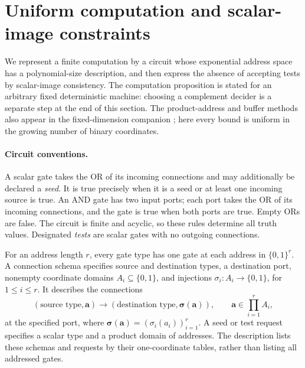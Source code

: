 \section{Uniform computation and scalar-image constraints}\label{sec:computation}

We represent a finite computation by a circuit whose exponential address
space has a polynomial-size description, and then express the absence of
accepting tests by scalar-image consistency. The computation proposition
is stated for an arbitrary fixed deterministic machine: choosing a
complement decider is a separate step at the end of this section.
The product-address and buffer methods also appear in the fixed-dimension
companion \citep[Sections~3--4]{CompanionFixedDimension}; here every bound
is uniform in the growing number of binary coordinates.

\paragraph{Circuit conventions.}
A scalar gate takes the OR of its incoming connections and may additionally
be declared a \emph{seed}. It is true precisely when it is a seed or at
least one incoming source is true. An AND gate has two input ports; each
port takes the OR of its incoming connections, and the gate is true when
both ports are true. Empty ORs are false. The circuit is finite and
acyclic, so these rules determine all truth values. Designated
\emph{tests} are scalar gates with no outgoing connections.

\begin{definition}\label{def:computation-product}
For an address length $r$, every gate type has one gate at each address in
$\{0,1\}^r$. A connection schema specifies source and destination types,
a destination port, nonempty coordinate domains
$A_i\subseteq\{0,1\}$, and injections
$\sigma_i:A_i\longrightarrow\{0,1\}$, for $1\le i\le r$.
It describes the connections
\[
 (\text{source type},\mathbf a)
 \longrightarrow
 (\text{destination type},\boldsymbol\sigma(\mathbf a)),
 \qquad
 \mathbf a\in\prod_{i=1}^r A_i,
\]
at the specified port, where
$\boldsymbol\sigma(\mathbf a)=(\sigma_i(a_i))_{i=1}^r$.
A seed or test request specifies a scalar type and a product domain of
addresses. The description lists these schemas and requests by their
one-coordinate tables, rather than listing all addressed gates.
\end{definition}

